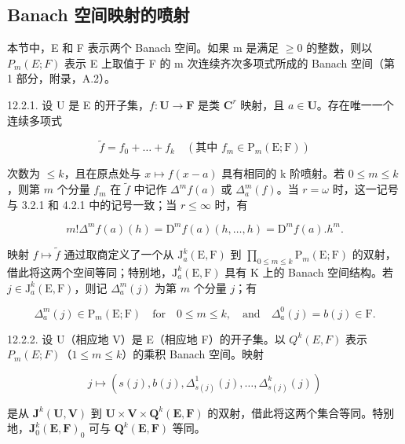 \subsection{Banach 空间映射的喷射}

本节中，E 和 F 表示两个 Banach 空间。如果 m 是满足 \(\geqslant0\) 的整数，则以 \(P_{m}(E;F)\) 表示 E 上取值于 F 的 m 次连续齐次多项式所成的 Banach 空间（第 1 部分，附录，A.2）。

12.2.1. 设 U 是 E 的开子集，\(f\colon\mathbf{U}\to\mathbf{F}\) 是类 \(\mathbf{C}^{r}\) 映射，且 \(a\in\mathbf{U}\)。存在唯一一个连续多项式

\[
\tilde {f} = f _ {0} + \dots + f _ {k} \quad (\text{其中 }f _ {m} \in \mathrm{P} _ {m} (\mathrm{E}; \mathrm{F}))
\]

次数为 \(\leqslant k\)，且在原点处与 \(x \mapsto f(x - a)\) 具有相同的 k 阶喷射。若 \(0 \leqslant m \leqslant k\)，则第 \(m\) 个分量 \(f_m\) 在 \(\tilde{f}\) 中记作 \(\Delta^m f(a)\) 或 \(\Delta_a^m(f)\)。当 \(r = \omega\) 时，这一记号与 3.2.1 和 4.2.1 中的记号一致；当 \(r \leqslant \infty\) 时，有

\[
m! \Delta^ {m} f (a) (h) = \mathrm{D} ^ {m} f (a) (h, \dots , h) = \mathrm{D} ^ {m} f (a). h ^ {m}.
\]

映射 \(f\mapsto\tilde{f}\) 通过取商定义了一个从 \(\mathrm{J}_{a}^{k}(\mathrm{E},\mathrm{F})\) 到 \(\prod_{0\leqslant m\leqslant k}\mathrm{P}_{m}(\mathrm{E};\mathrm{F})\) 的双射，借此将这两个空间等同；特别地，\(\mathrm{J}_{a}^{k}(\mathrm{E},\mathrm{F})\) 具有 K 上的 Banach 空间结构。若 \(j\in\mathrm{J}_{a}^{k}(\mathrm{E},\mathrm{F})\)，则记 \(\Delta_{a}^{m}(j)\) 为第 \(m\) 个分量 \(j\)；有

\[
\Delta_ {a} ^ {m} (j) \in \mathrm{P} _ {m} (\mathrm{E}; \mathrm{F}) \quad \text {for} \quad 0 \leqslant m \leqslant k, \quad \text {and} \quad \Delta_ {a} ^ {0} (j) = b (j) \in \mathrm{F}.
\]

12.2.2. 设 U（相应地 V）是 E（相应地 F）的开子集。以 \(Q^{k}(E, F)\) 表示 \(P_{m}(E; F)\)（\(1 \leqslant m \leqslant k\)）的乘积 Banach 空间。映射

\[
j \mapsto (s (j), b (j), \Delta_ {s (j)} ^ {1} (j), \dots , \Delta_ {s (j)} ^ {k} (j))
\]

是从 \(\mathbf{J}^{k}(\mathbf{U},\mathbf{V})\) 到 \(\mathbf{U}\times\mathbf{V}\times\mathbf{Q}^{k}(\mathbf{E},\mathbf{F})\) 的双射，借此将这两个集合等同。特别地，\(\mathbf{J}_{0}^{k}(\mathbf{E},\mathbf{F})_{0}\) 可与 \(\mathbf{Q}^{k}(\mathbf{E},\mathbf{F})\) 等同。


